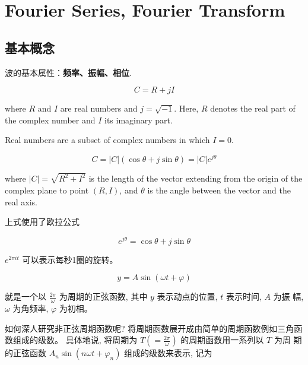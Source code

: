 \chapter{Fourier Series, Fourier  Transform}

\section{基本概念}

\begin{definition}[波]
    波的基本属性：\textbf{频率、振幅、相位}.
\end{definition}

\begin{definition}
    $$ C=R+j I $$

    where $ R $ and $ I $ are real numbers and $ j=\sqrt{-1} $. Here, $ R $ denotes the real part of the complex number and $ I $ its imaginary part. 
    
    Real numbers are a subset of complex numbers in which $I = 0$.
\end{definition}

\begin{definition}
    $$ C=|C|(\cos \theta+j \sin \theta) = |C| e^{j \theta} $$
    
    where $ |C|=\sqrt{R^{2}+I^{2}} $ is the length of the vector extending from the origin of the complex plane to point $ (R, I) $, and $ \theta $ is the angle between the vector and the real axis.
\end{definition}

上式使用了欧拉公式

\begin{theorem}
    $$ e^{j \theta}=\cos \theta+j \sin \theta $$
\end{theorem}

\begin{corollary}
    $e^{2 \pi it}$ 可以表示每秒1圈的旋转。 
\end{corollary}

\begin{definition}[正弦函数]
    $$ y=A \sin (\omega t+\varphi) $$

    就是一个以 $ \frac{2 \pi}{\omega} $ 为周期的正弦函数, 其中 $ y $ 表示动点的位置, $ t $ 表示时间, $ A $ 为振 幅, $ \omega $ 为角频率, $ \varphi $ 为初相。
\end{definition}

如何深人研究非正弦周期函数呢? 将周期函数展开成由简单的周期函数例如三角函数组成的级数。 具体地说, 将周期为 $ T\left(=\frac{2 \pi}{\omega}\right) $ 的周期函数用一系列以 $ T $ 为周 期的正弦函数 $ A_{n} \sin \left(n \omega t+\varphi_{n}\right) $ 组成的级数来表示, 记为

